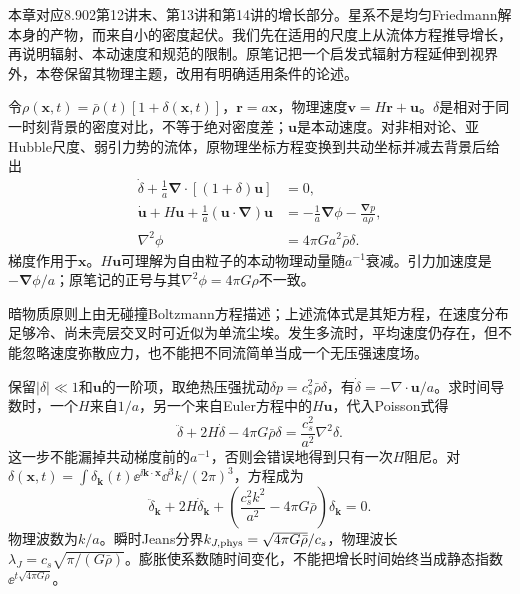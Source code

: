 本章对应8.902第12讲末、第13讲和第14讲的增长部分。星系不是均匀Friedmann解本身的产物，而来自小的密度起伏。我们先在适用的尺度上从流体方程推导增长，再说明辐射、本动速度和规范的限制。原笔记把一个启发式辐射方程延伸到视界外，本卷保留其物理主题，改用有明确适用条件的论述。

令$\rho(\mathbf x,t)=\bar\rho(t)[1+\delta(\mathbf x,t)]$，$\mathbf r=a\mathbf x$，物理速度$\mathbf v=H\mathbf r+\mathbf u$。$\delta$是相对于同一时刻背景的密度对比，不等于绝对密度差；$\mathbf u$是本动速度。对非相对论、亚Hubble尺度、弱引力势的流体，原物理坐标方程变换到共动坐标并减去背景后给出
\begin{align}
 \dot\delta+\frac1a\boldsymbol\nabla\!\cdot[(1+\delta)\mathbf u]&=0,\label{eq:astro-pert-cont}\\
 \dot{\mathbf u}+H\mathbf u+\frac1a(\mathbf u\cdot\boldsymbol\nabla)\mathbf u
 &=-\frac1a\boldsymbol\nabla\phi-\frac{\boldsymbol\nabla p}{a\rho},\label{eq:astro-pert-euler}\\
 \nabla^2\phi&=4\pi Ga^2\bar\rho\delta.\label{eq:astro-pert-poisson}
\end{align}
梯度作用于$\mathbf x$。$H\mathbf u$可理解为自由粒子的本动物理动量随$a^{-1}$衰减。引力加速度是$-\boldsymbol\nabla\phi/a$；原笔记的正号与其$\nabla^2\phi=4\pi G\rho$不一致。

暗物质原则上由无碰撞Boltzmann方程描述；上述流体式是其矩方程，在速度分布足够冷、尚未壳层交叉时可近似为单流尘埃。发生多流时，平均速度仍存在，但不能忽略速度弥散应力，也不能把不同流简单当成一个无压强速度场。

保留$|\delta|\ll1$和$\mathbf u$的一阶项，取绝热压强扰动$\delta p=c_s^2\bar\rho\delta$，有$\dot\delta=-\nabla\cdot\mathbf u/a$。求时间导数时，一个$H$来自$1/a$，另一个来自Euler方程中的$H\mathbf u$，代入Poisson式得
\begin{equation}\label{eq:astro-growth}
 \ddot\delta+2H\dot\delta-4\pi G\bar\rho\delta
 =\frac{c_s^2}{a^2}\nabla^2\delta.
\end{equation}
这一步不能漏掉共动梯度前的$a^{-1}$，否则会错误地得到只有一次$H$阻尼。对
$\delta(\mathbf x,t)=\int\delta_{\mathbf k}(t)\ee^{\ii\mathbf k\cdot\mathbf x}\dd^3k/(2\pi)^3$，方程成为
\[
 \ddot\delta_{\mathbf k}+2H\dot\delta_{\mathbf k}
 +\left(\frac{c_s^2k^2}{a^2}-4\pi G\bar\rho\right)\delta_{\mathbf k}=0.
\]
物理波数为$k/a$。瞬时Jeans分界$k_{J,\rm phys}=\sqrt{4\pi G\bar\rho}/c_s$，物理波长$\lambda_J=c_s\sqrt{\pi/(G\bar\rho)}$。膨胀使系数随时间变化，不能把增长时间始终当成静态指数$\ee^{t\sqrt{4\pi G\rho}}$。

